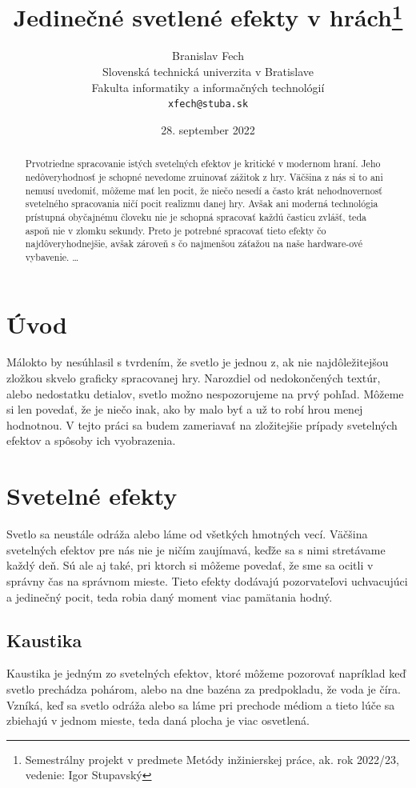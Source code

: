 \documentclass[10pt,twoside,slovak,a4paper]{article}
\title{Jedinečné svetlené efekty v hrách\thanks{Semestrálny projekt v predmete Metódy inžinierskej práce, ak. rok 2022/23, vedenie: Igor Stupavský}} %
\author{Branislav Fech\\[2pt]
	{\small Slovenská technická univerzita v Bratislave}\\
	{\small Fakulta informatiky a informačných technológií}\\
	{\small \texttt{xfech@stuba.sk}}
	}
\date{\small 28. september 2022} %
\begin{document}
\maketitle

\begin{abstract}
Prvotriedne spracovanie istých svetelných efektov je kritické v modernom hraní. 
Jeho nedôveryhodnosť je schopné nevedome zruinovať zážitok z hry. Väčšina z nás 
si to ani nemusí uvedomiť, môžeme mať len pocit, že niečo nesedí a často krát 
nehodnovernosť svetelného spracovania ničí pocit realizmu danej hry. Avšak ani 
moderná technológia prístupná obyčajnému človeku nie je schopná spracovať každú 
časticu zvlášť, teda aspoň nie v zlomku sekundy. Preto je potrebné spracovať tieto 
efekty čo najdôveryhodnejšie, avšak zároveň s čo najmenšou záťažou na naše hardware-ové 
vybavenie.
\ldots
\end{abstract}



\section{Úvod}
Málokto by nesúhlasil s tvrdením, že svetlo je jednou z, ak nie najdôležitejšou 
zložkou skvelo graficky spracovanej hry. Narozdiel od nedokončených textúr, alebo 
nedostatku detialov, svetlo možno nespozorujeme na prvý pohľad. Môžeme si len povedať, 
že je niečo inak, ako by malo byť a už to robí hrou menej hodnotnou. V tejto práci sa 
budem zameriavať na zložitejšie prípady svetelných efektov a spôsoby ich vyobrazenia.

\section{Svetelné efekty} \label{se}
Svetlo sa neustále odráža alebo láme od všetkých hmotných vecí. Väčšina svetelných 
efektov pre nás nie je ničím zaujímavá, keďže sa s nimi stretávame každý deň. Sú ale 
aj také, pri ktorch si môžeme povedať, že sme sa ocitli v správny čas na správnom mieste.
Tieto efekty dodávajú  pozorvateľovi uchvacujúci a jedinečný pocit, teda robia daný 
moment viac pamätania hodný.

\subsection{Kaustika} \label{se:kaustika}
Kaustika je jedným zo svetelných efektov, ktoré môžeme pozorovať napríklad keď svetlo 
prechádza pohárom, alebo na dne bazéna za predpokladu, že voda je číra. Vzníká, keď sa 
svetlo odráža alebo sa láme pri prechode médiom a tieto lúče sa zbiehajú v jednom mieste, 
teda daná plocha je viac osvetlená.
\end{document}
